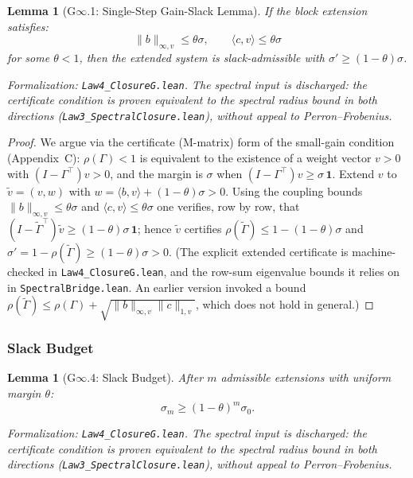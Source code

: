 \documentclass[12pt]{article}
\newtheorem{lemma}[theorem]{Lemma}
\begin{document}
\begin{lemma}[G$\infty$.1: Single-Step Gain-Slack Lemma]
\label{lem:single-step}
If the block extension satisfies:
\[
\|b\|_{\infty, v} \leq \theta \sigma, \qquad \langle c, v \rangle \leq \theta \sigma
\]
for some $\theta < 1$, then the extended system is slack-admissible with $\sigma' \geq (1 - \theta)\sigma$.
\end{lemma}
\noindent\textit{Formalization: \texttt{Law4\_ClosureG.lean}. The spectral input is discharged: the certificate condition is proven equivalent to the spectral radius bound in both directions (\texttt{Law3\_SpectralClosure.lean}), without appeal to Perron--Frobenius.}

\begin{proof}
We argue via the certificate (M-matrix) form of the small-gain condition (Appendix~C): $\rho(\Gamma) < 1$ is equivalent to the existence of a weight vector $v > 0$ with $(I - \Gamma^\top)v > 0$, and the margin is $\sigma$ when $(I - \Gamma^\top)v \geq \sigma\,\mathbf{1}$. Extend $v$ to $\tilde{v} = (v, w)$ with $w = \langle b, v\rangle + (1-\theta)\sigma > 0$. Using the coupling bounds $\|b\|_{\infty,v} \leq \theta\sigma$ and $\langle c, v\rangle \leq \theta\sigma$ one verifies, row by row, that $(I - \tilde{\Gamma}^\top)\tilde{v} \geq (1-\theta)\sigma\,\mathbf{1}$; hence $\tilde{v}$ certifies $\rho(\tilde{\Gamma}) \leq 1 - (1-\theta)\sigma$ and $\sigma' = 1 - \rho(\tilde{\Gamma}) \geq (1-\theta)\sigma > 0$. (The explicit extended certificate is machine-checked in \texttt{Law4\_ClosureG.lean}, and the row-sum eigenvalue bounds it relies on in \texttt{SpectralBridge.lean}. An earlier version invoked a bound $\rho(\tilde{\Gamma}) \leq \rho(\Gamma) + \sqrt{\|b\|_{\infty,v}\|c\|_{1,v}}$, which does not hold in general.)
\end{proof}

\subsubsection{Slack Budget}

\begin{lemma}[G$\infty$.4: Slack Budget]
\label{lem:slack-budget}
After $m$ admissible extensions with uniform margin $\theta$:
\[
\sigma_m \geq (1 - \theta)^m \sigma_0.
\]
\end{lemma}
\noindent\textit{Formalization: \texttt{Law4\_ClosureG.lean}. The spectral input is discharged: the certificate condition is proven equivalent to the spectral radius bound in both directions (\texttt{Law3\_SpectralClosure.lean}), without appeal to Perron--Frobenius.}
\end{document}
